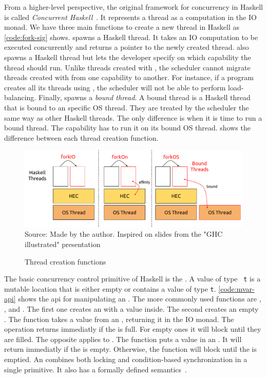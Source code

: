 From a higher-level perspective, the original framework for concurrency in Haskell is called \emph{Concurrent Haskell}~\cite{smpj:1996}. It represents a thread as a computation in the IO monad. We have three main functions to create a new thread in Haskell as \autoref{code:fork-sig} shows. \forkIO spawns a Haskell thread. It takes an IO computation to be executed concurrently and returns a pointer to the newly created thread. \forkOn also spawns a Haskell thread but lets the developer specify on which capability the thread should run. Unlike threads created with \forkIO, the scheduler cannot migrate threads created with \forkOn from one capability to another. For instance, if a program creates all its threads using \forkOn, the scheduler will not be able to perform load-balancing. Finally, \forkOS spawns a \emph{bound thread}. A bound thread is a Haskell thread that is bound to an specific OS thread. They are treated by the scheduler the same way as other Haskell threads. The only difference is when it is time to run a bound thread. The capability has to run it on its bound OS thread.  shows the difference between each thread creation function.

\begin{figure}[htp]
  \centering
  \caption{Thread creation functions}
  \includegraphics[width=\columnwidth]{images/haskell-threads}
  \footnotesize{Source: Made by the author. Inspired on slides from the "GHC illustrated" presentation~\cite{takenobu:2015}}
  \label{fig:haskell-threads}
\end{figure}

The basic concurrency control primitive of Haskell is the \MVar. A value of type \MVar~\texttt{t} is a mutable location that is either empty or contains a value of type \texttt{t}. \autoref{code:mvar-api} shows the \ac{api} for manipulating an \MVar. The more commonly used functions are \newMVar, \newEmptyMVar, \takeMVar and \putMVar. The first one creates an \MVar with a value inside. The second creates an empty \MVar. The \takeMVar function takes a value from an \MVar, returning it in the IO monad. The operation returns immediatly if the \MVar is full. For empty ones it will block until they are filled. The opposite applies to \putMVar. The function puts a value in an \MVar. It will return immediatly if the \MVar is empty. Otherwise, the function will block until the \MVar is emptied. An \MVar combines both locking and condition-based synchronization in a single primitive. It also has a formally defined semantics~\cite{smpj:1996}.

